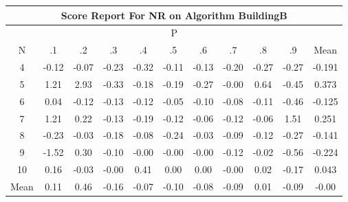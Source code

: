 \documentclass[11pt,a4paper]{report}
\begin{document}
\begin{longtable}{ | c || c | c | c | c | c | c | c | c | c || c |}
\hline
\multicolumn{11}{|c|}{ Score Report For NR on Algorithm BuildingB} \\
\hline
\multicolumn{11}{|c|}{ P } \\
\hline
N & .1 & .2 & .3 & .4 & .5 & .6 & .7 & .8 & .9 & Mean\\
 \hline
 \hline
 \endhead
  4 &  \cellcolor[HTML]{FFFFFF} -0.12 &  \cellcolor[HTML]{FFFFFF} -0.07 &  \cellcolor[HTML]{FFF7F7} -0.23 &  \cellcolor[HTML]{FFF7F7} -0.32 &  \cellcolor[HTML]{FFFFFF} -0.11 &  \cellcolor[HTML]{FFFFFF} -0.13 &  \cellcolor[HTML]{FFF7F7} -0.20 &  \cellcolor[HTML]{FFF7F7} -0.27 &  \cellcolor[HTML]{FFF7F7} -0.27 & -0.191 \\
  5 &  \cellcolor[HTML]{DFDFFF} 1.21 &  \cellcolor[HTML]{B7B7FF} 2.93 &  \cellcolor[HTML]{FFF7F7} -0.33 &  \cellcolor[HTML]{FFF7F7} -0.18 &  \cellcolor[HTML]{FFF7F7} -0.19 &  \cellcolor[HTML]{FFF7F7} -0.27 &  \cellcolor[HTML]{FFFFFF} -0.00 &  \cellcolor[HTML]{EFEFFF} 0.64 &  \cellcolor[HTML]{FFF7F7} -0.45 & 0.373 \\
  6 &  \cellcolor[HTML]{FFFFFF} 0.04 &  \cellcolor[HTML]{FFFFFF} -0.12 &  \cellcolor[HTML]{FFFFFF} -0.13 &  \cellcolor[HTML]{FFFFFF} -0.12 &  \cellcolor[HTML]{FFFFFF} -0.05 &  \cellcolor[HTML]{FFFFFF} -0.10 &  \cellcolor[HTML]{FFFFFF} -0.08 &  \cellcolor[HTML]{FFFFFF} -0.11 &  \cellcolor[HTML]{FFF7F7} -0.46 & -0.125 \\
  7 &  \cellcolor[HTML]{DFDFFF} 1.21 &  \cellcolor[HTML]{F7F7FF} 0.22 &  \cellcolor[HTML]{FFFFFF} -0.13 &  \cellcolor[HTML]{FFF7F7} -0.19 &  \cellcolor[HTML]{FFFFFF} -0.12 &  \cellcolor[HTML]{FFFFFF} -0.06 &  \cellcolor[HTML]{FFFFFF} -0.12 &  \cellcolor[HTML]{FFFFFF} -0.06 &  \cellcolor[HTML]{D7D7FF} 1.51 & 0.251 \\
  8 &  \cellcolor[HTML]{FFF7F7} -0.23 &  \cellcolor[HTML]{FFFFFF} -0.03 &  \cellcolor[HTML]{FFF7F7} -0.18 &  \cellcolor[HTML]{FFFFFF} -0.08 &  \cellcolor[HTML]{FFF7F7} -0.24 &  \cellcolor[HTML]{FFFFFF} -0.03 &  \cellcolor[HTML]{FFFFFF} -0.09 &  \cellcolor[HTML]{FFFFFF} -0.12 &  \cellcolor[HTML]{FFF7F7} -0.27 & -0.141 \\
  9 &  \cellcolor[HTML]{FFD7D7} -1.52 &  \cellcolor[HTML]{F7F7FF} 0.30 &  \cellcolor[HTML]{FFFFFF} -0.10 &  \cellcolor[HTML]{FFFFFF} -0.00 &  \cellcolor[HTML]{FFFFFF} -0.00 &  \cellcolor[HTML]{FFFFFF} -0.00 &  \cellcolor[HTML]{FFFFFF} -0.12 &  \cellcolor[HTML]{FFFFFF} -0.02 &  \cellcolor[HTML]{FFEFEF} -0.56 & -0.224 \\
  10 &  \cellcolor[HTML]{F7F7FF} 0.16 &  \cellcolor[HTML]{FFFFFF} -0.03 &  \cellcolor[HTML]{FFFFFF} -0.00 &  \cellcolor[HTML]{F7F7FF} 0.41 &  \cellcolor[HTML]{FFFFFF} 0.00 &  \cellcolor[HTML]{FFFFFF} 0.00 &  \cellcolor[HTML]{FFFFFF} -0.00 &  \cellcolor[HTML]{FFFFFF} 0.02 &  \cellcolor[HTML]{FFF7F7} -0.17 & 0.043 \\
 \hline
 \hline
Mean &  \cellcolor[HTML]{FFFFFF} 0.11 &  \cellcolor[HTML]{F7F7FF} 0.46 &  \cellcolor[HTML]{FFFFFF} -0.16 &  \cellcolor[HTML]{FFFFFF} -0.07 &  \cellcolor[HTML]{FFFFFF} -0.10 &  \cellcolor[HTML]{FFFFFF} -0.08 &  \cellcolor[HTML]{FFFFFF} -0.09 &  \cellcolor[HTML]{FFFFFF} 0.01 &  \cellcolor[HTML]{FFFFFF} -0.09 &  \cellcolor[HTML]{FFFFFF} -0.00
\end{longtable}
\end{document}
